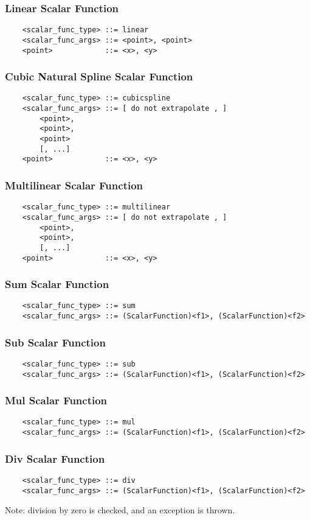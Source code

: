\subsubsection{Linear Scalar Function}
\begin{verbatim}
    <scalar_func_type> ::= linear
    <scalar_func_args> ::= <point>, <point>
    <point>            ::= <x>, <y>
\end{verbatim}

\subsubsection{Cubic Natural Spline Scalar Function}
\begin{verbatim}
    <scalar_func_type> ::= cubicspline
    <scalar_func_args> ::= [ do not extrapolate , ]
        <point>, 
        <point>, 
        <point>
        [, ...]
    <point>            ::= <x>, <y>
\end{verbatim}

\subsubsection{Multilinear Scalar Function}
\begin{verbatim}
    <scalar_func_type> ::= multilinear
    <scalar_func_args> ::= [ do not extrapolate , ]
        <point>, 
        <point>, 
        [, ...]
    <point>            ::= <x>, <y>
\end{verbatim}

\subsubsection{Sum Scalar Function}
\begin{verbatim}
    <scalar_func_type> ::= sum
    <scalar_func_args> ::= (ScalarFunction)<f1>, (ScalarFunction)<f2>
\end{verbatim}

\subsubsection{Sub Scalar Function}
\begin{verbatim}
    <scalar_func_type> ::= sub
    <scalar_func_args> ::= (ScalarFunction)<f1>, (ScalarFunction)<f2>
\end{verbatim}

\subsubsection{Mul Scalar Function}
\begin{verbatim}
    <scalar_func_type> ::= mul
    <scalar_func_args> ::= (ScalarFunction)<f1>, (ScalarFunction)<f2>
\end{verbatim}

\subsubsection{Div Scalar Function}
\begin{verbatim}
    <scalar_func_type> ::= div
    <scalar_func_args> ::= (ScalarFunction)<f1>, (ScalarFunction)<f2>
\end{verbatim}
Note: division by zero is checked, and an exception is thrown.

